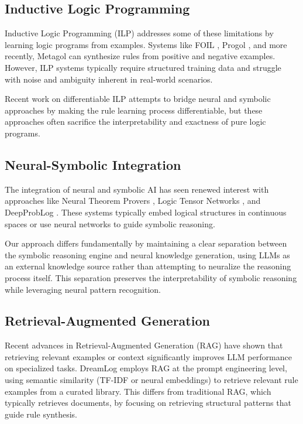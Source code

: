 \documentclass[10pt,conference]{IEEEtran}
\begin{document}
\subsection{Inductive Logic Programming}

Inductive Logic Programming (ILP) \cite{muggleton1994inductive} addresses some of these limitations by learning logic programs from examples. Systems like FOIL \cite{quinlan1990learning}, Progol \cite{muggleton1995inverse}, and more recently, Metagol \cite{muggleton2015meta} can synthesize rules from positive and negative examples. However, ILP systems typically require structured training data and struggle with noise and ambiguity inherent in real-world scenarios.

Recent work on differentiable ILP \cite{evans2018learning} attempts to bridge neural and symbolic approaches by making the rule learning process differentiable, but these approaches often sacrifice the interpretability and exactness of pure logic programs.

\subsection{Neural-Symbolic Integration}

The integration of neural and symbolic AI has seen renewed interest with approaches like Neural Theorem Provers \cite{rocktaschel2017end}, Logic Tensor Networks \cite{serafini2016logic}, and DeepProbLog \cite{manhaeve2018deepproblog}. These systems typically embed logical structures in continuous spaces or use neural networks to guide symbolic reasoning.

Our approach differs fundamentally by maintaining a clear separation between the symbolic reasoning engine and neural knowledge generation, using LLMs as an external knowledge source rather than attempting to neuralize the reasoning process itself. This separation preserves the interpretability of symbolic reasoning while leveraging neural pattern recognition.

\subsection{Retrieval-Augmented Generation}

Recent advances in Retrieval-Augmented Generation (RAG) have shown that retrieving relevant examples or context significantly improves LLM performance on specialized tasks. DreamLog employs RAG at the prompt engineering level, using semantic similarity (TF-IDF or neural embeddings) to retrieve relevant rule examples from a curated library. This differs from traditional RAG, which typically retrieves documents, by focusing on retrieving structural patterns that guide rule synthesis.
\end{document}
